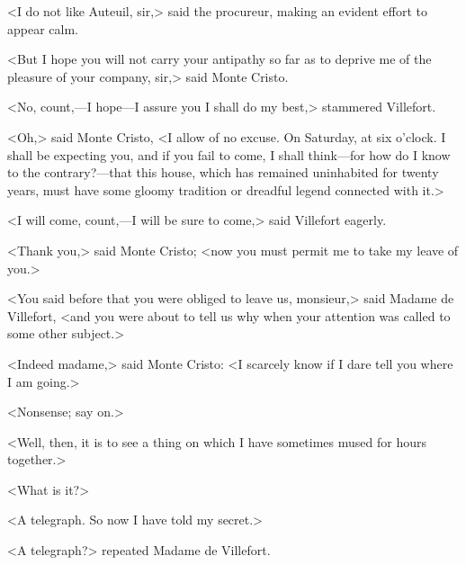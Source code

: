  <I do not like Auteuil, sir,> said the procureur, making an evident effort to appear calm. 

 <But I hope you will not carry your antipathy so far as to deprive me of the pleasure of your company, sir,> said Monte Cristo. 

 <No, count,—I hope—I assure you I shall do my best,> stammered Villefort. 

 <Oh,> said Monte Cristo, <I allow of no excuse. On Saturday, at six o'clock. I shall be expecting you, and if you fail to come, I shall think—for how do I know to the contrary?—that this house, which has remained uninhabited for twenty years, must have some gloomy tradition or dreadful legend connected with it.> 

 <I will come, count,—I will be sure to come,> said Villefort eagerly. 

 <Thank you,> said Monte Cristo; <now you must permit me to take my leave of you.> 

 <You said before that you were obliged to leave us, monsieur,> said Madame de Villefort, <and you were about to tell us why when your attention was called to some other subject.> 

 <Indeed madame,> said Monte Cristo: <I scarcely know if I dare tell you where I am going.> 

 <Nonsense; say on.> 

 <Well, then, it is to see a thing on which I have sometimes mused for hours together.> 

 <What is it?> 

 <A telegraph. So now I have told my secret.> 

 <A telegraph?> repeated Madame de Villefort. 

